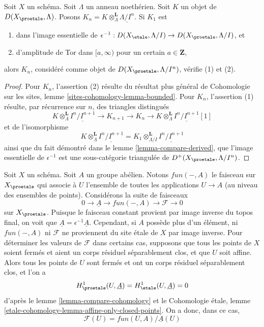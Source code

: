 \begin{lemma}
\label{lemma-compare-truncations}
Soit $X$ un schéma. Soit $\Lambda$ un anneau noethérien.
Soit $K$ un objet de $D(X_\proetale, \Lambda)$.
Posons $K_n = K \otimes_\Lambda^\mathbf{L} \underline{\Lambda/I^n}$.
Si $K_1$ est
\begin{enumerate}
\item dans l'image essentielle de
$\epsilon^{-1} :D(X_\etale, \Lambda/I) \to D(X_\proetale, \Lambda/I)$, et
\item d'amplitude de Tor dans $[a,\infty)$ pour un certain $a \in \mathbf{Z}$,
\end{enumerate}
alors $K_n$, considéré comme objet de $D(X_\proetale, \Lambda/I^n)$, vérifie (1) et (2).
\end{lemma}

\begin{proof}
Pour $K_n$, l'assertion (2) résulte du résultat plus général de
Cohomologie sur les sites, lemme \ref{sites-cohomology-lemma-bounded}.
Pour $K_n$, l'assertion (1) résulte, par récurrence sur $n$, des
triangles distingués
$$
K \otimes_\Lambda^\mathbf{L} \underline{I^n/I^{n + 1}} \to
K_{n + 1} \to
K_n \to
K \otimes_\Lambda^\mathbf{L} \underline{I^n/I^{n + 1}}[1]
$$
et de l'isomorphisme
$$
K \otimes_\Lambda^\mathbf{L} \underline{I^n/I^{n + 1}} =
K_1 \otimes_{\Lambda/I}^\mathbf{L} \underline{I^n/I^{n + 1}}
$$
ainsi que du fait démontré dans le lemme \ref{lemma-compare-derived},
que l'image essentielle de $\epsilon^{-1}$ est une sous-catégorie triangulée
de $D^+(X_\proetale, \Lambda/I^n)$.
\end{proof}

\begin{example}
\label{example-functions-mod-locally-constant-functions}
Soit $X$ un schéma. Soit $A$ un groupe abélien. Notons
$fun(-, A)$ le faisceau sur $X_\proetale$ qui associe à $U$
l'ensemble de toutes les applications $U \to A$ (au niveau des ensembles de points).
Considérons la suite de faisceaux
$$
0 \to \underline{A} \to fun(-, A) \to \mathcal{F} \to 0
$$
sur $X_\proetale$. Puisque le faisceau constant provient par image inverse du topos
final, on voit que $\underline{A} = \epsilon^{-1}\underline{A}$.
Cependant, si $A$ possède plus d'un élément, ni $fun(-, A)$
ni $\mathcal{F}$ ne proviennent du site \'etale de $X$ par image inverse.
Pour déterminer les valeurs de $\mathcal{F}$ dans certains cas, supposons que
tous les points de $X$ soient fermés et aient un corps résiduel séparablement clos,
et que $U$ soit affine. Alors tous les points de $U$ sont fermés et ont un corps
résiduel séparablement clos, et l'on a
$$
H^1_\proetale(U, \underline{A}) =
H^1_\etale(U, \underline{A}) = 0
$$
d'après le lemme \ref{lemma-compare-cohomology} et le
Cohomologie \'etale, lemme
\ref{etale-cohomology-lemma-affine-only-closed-points}.
On a donc, dans ce cas,
$$
\mathcal{F}(U) = fun(U, A)/\underline{A}(U)
$$
\end{example}





